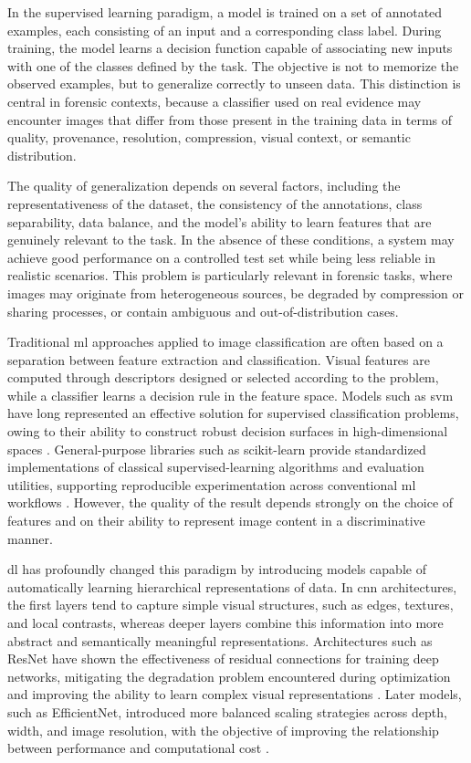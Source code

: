 In the supervised learning paradigm, a model is trained on a set of annotated
examples, each consisting of an input and a corresponding class label. During
training, the model learns a decision function capable of associating new
inputs with one of the classes defined by the task. The objective is not to
memorize the observed examples, but to generalize correctly to unseen data.
This distinction is central in forensic contexts, because a classifier used on
real evidence may encounter images that differ from those present in the
training data in terms of quality, provenance, resolution, compression, visual
context, or semantic distribution.

The quality of generalization depends on several factors, including the
representativeness of the dataset, the consistency of the annotations, class
separability, data balance, and the model's ability to learn features that are
genuinely relevant to the task. In the absence of these conditions, a system may
achieve good performance on a controlled test set while being less reliable in
realistic scenarios. This problem is particularly relevant in forensic tasks,
where images may originate from heterogeneous sources, be degraded by
compression or sharing processes, or contain ambiguous and out-of-distribution
cases.

Traditional \gls{ml} approaches applied to image classification are often based
on a separation between feature extraction and classification. Visual features
are computed through descriptors designed or selected according to the problem,
while a classifier learns a decision rule in the feature space. Models such as
\gls{svm} have long represented an effective solution for supervised
classification problems, owing to their ability to construct robust decision
surfaces in high-dimensional spaces
\cite{cortes1995support,bishop2006pattern}. General-purpose libraries such as
scikit-learn provide standardized implementations of classical supervised-learning
algorithms and evaluation utilities, supporting reproducible experimentation
across conventional \gls{ml} workflows \cite{pedregosa2011scikit}. However, the
quality of the result depends strongly on the choice of features and on their
ability to represent image content in a discriminative manner.

\gls{dl} has profoundly changed this paradigm by introducing models capable of
automatically learning hierarchical representations of data. In \gls{cnn} architectures,
the first layers tend to capture simple visual structures, such as edges, textures, and local contrasts,
whereas deeper layers combine this information into more abstract and
semantically meaningful representations. Architectures such as ResNet have
shown the effectiveness of residual connections for training deep networks,
mitigating the degradation problem encountered during optimization and improving
the ability to learn complex visual representations \cite{he2016deep}. Later
models, such as EfficientNet, introduced more balanced scaling strategies across
depth, width, and image resolution, with the objective of improving the
relationship between performance and computational cost \cite{tan2019efficientnet}.

